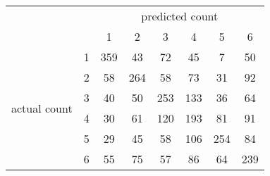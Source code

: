 
\begin{tabular}{*{8}{c}}
& & \multicolumn{6}{c}{predicted count} \\
& & 1 & 2 & 3 & 4 & 5 & 6 \\
\multirow{6}{*}{\begin{sideways}actual count\end{sideways}}
& 1 & \cellcolor[rgb]{0.100000,1.000000,0.000000}359 & \cellcolor[rgb]{0.977899,0.024557,0.000000}43 & \cellcolor[rgb]{0.857178,0.158691,0.000000}72 & \cellcolor[rgb]{0.974698,0.028113,0.000000}45 & \cellcolor[rgb]{0.998144,0.002062,0.000000}7 & \cellcolor[rgb]{0.964608,0.039325,0.000000}50 \\
& 2 & \cellcolor[rgb]{0.940065,0.066594,0.000000}58 & \cellcolor[rgb]{0.100008,0.999991,0.000000}264 & \cellcolor[rgb]{0.940065,0.066594,0.000000}58 & \cellcolor[rgb]{0.848635,0.168184,0.000000}73 & \cellcolor[rgb]{0.990260,0.010823,0.000000}31 & \cellcolor[rgb]{0.612395,0.430672,0.000000}92 \\
& 3 & \cellcolor[rgb]{0.981972,0.020031,0.000000}40 & \cellcolor[rgb]{0.964608,0.039325,0.000000}50 & \cellcolor[rgb]{0.100017,0.999982,0.000000}253 & \cellcolor[rgb]{0.164097,0.928781,0.000000}133 & \cellcolor[rgb]{0.986278,0.015247,0.000000}36 & \cellcolor[rgb]{0.912110,0.097655,0.000000}64 \\
& 4 & \cellcolor[rgb]{0.990906,0.010104,0.000000}30 & \cellcolor[rgb]{0.927304,0.080773,0.000000}61 & \cellcolor[rgb]{0.243143,0.840953,0.000000}120 & \cellcolor[rgb]{0.101069,0.998813,0.000000}193 & \cellcolor[rgb]{0.765486,0.260572,0.000000}81 & \cellcolor[rgb]{0.627641,0.413733,0.000000}91 \\
& 5 & \cellcolor[rgb]{0.991511,0.009433,0.000000}29 & \cellcolor[rgb]{0.974698,0.028113,0.000000}45 & \cellcolor[rgb]{0.940065,0.066594,0.000000}58 & \cellcolor[rgb]{0.400007,0.666659,0.000000}106 & \cellcolor[rgb]{0.100015,0.999983,0.000000}254 & \cellcolor[rgb]{0.727607,0.302659,0.000000}84 \\
& 6 & \cellcolor[rgb]{0.950720,0.054756,0.000000}55 & \cellcolor[rgb]{0.830334,0.188518,0.000000}75 & \cellcolor[rgb]{0.943835,0.062405,0.000000}57 & \cellcolor[rgb]{0.700526,0.332749,0.000000}86 & \cellcolor[rgb]{0.912110,0.097655,0.000000}64 & \cellcolor[rgb]{0.100044,0.999951,0.000000}239 \\
\end{tabular}

